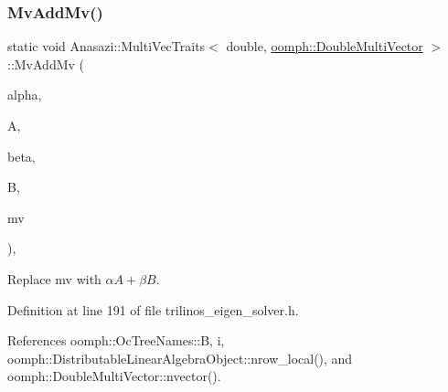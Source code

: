 \subsubsection{\texorpdfstring{Mv\+Add\+Mv()}{MvAddMv()}}
{\footnotesize\ttfamily static void Anasazi\+::\+Multi\+Vec\+Traits$<$ double, \hyperlink{classoomph_1_1DoubleMultiVector}{oomph\+::\+Double\+Multi\+Vector} $>$\+::Mv\+Add\+Mv (\begin{DoxyParamCaption}\item[{const double}]{alpha,  }\item[{const \hyperlink{classoomph_1_1DoubleMultiVector}{oomph\+::\+Double\+Multi\+Vector} \&}]{A,  }\item[{const double}]{beta,  }\item[{const \hyperlink{classoomph_1_1DoubleMultiVector}{oomph\+::\+Double\+Multi\+Vector} \&}]{B,  }\item[{\hyperlink{classoomph_1_1DoubleMultiVector}{oomph\+::\+Double\+Multi\+Vector} \&}]{mv }\end{DoxyParamCaption})\hspace{0.3cm}{\ttfamily [inline]}, {\ttfamily [static]}}



Replace {\ttfamily mv} with $\alpha A + \beta B$. 



Definition at line 191 of file trilinos\+\_\+eigen\+\_\+solver.\+h.



References oomph\+::\+Oc\+Tree\+Names\+::B, i, oomph\+::\+Distributable\+Linear\+Algebra\+Object\+::nrow\+\_\+local(), and oomph\+::\+Double\+Multi\+Vector\+::nvector().

\mbox{\label{classAnasazi_1_1MultiVecTraits_3_01double_00_01oomph_1_1DoubleMultiVector_01_4_acb2e5efa75fb3970e1ecf716f10b4ee5}} 
